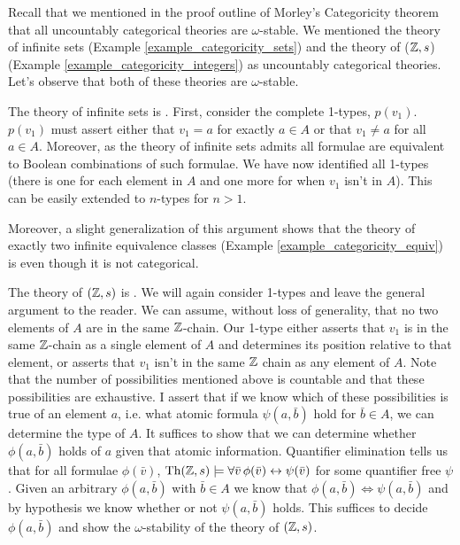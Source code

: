 Recall that we mentioned in the proof outline of Morley's Categoricity theorem that all uncountably categorical theories are \(\omega\)-stable. 
We mentioned the theory of infinite sets (Example \ref{example_categoricity_sets}) and the theory of (\(\mathbb{Z}, s\)) (Example \ref{example_categoricity_integers}) as uncountably categorical theories. 
Let's observe that both of these theories are \(\omega\)-stable. 

\begin{example}\label{example_omst_sets}
The theory of infinite sets is \omst. 
First, consider the complete 1-types, \(p(v_1)\). \(p(v_1)\) must assert either that \(v_1 = a\) for exactly \(a \in A\) or that \(v_1 \neq a\) for all \(a \in A\). 
Moreover, as the theory of infinite sets admits \qe \cite{mar} all formulae are equivalent to Boolean combinations of such formulae. %
We have now identified all 1-types (there is one for each element in \(A\) and one more for when \(v_1\) isn't in \(A\)). 
This can be easily extended to \(n\)-types for \(n > 1\).

Moreover, a slight generalization of this argument shows that the theory of exactly two infinite equivalence classes (Example \ref{example_categoricity_equiv}) is \omst even though it is not categorical. 
\end{example}

\begin{example}\label{example_omst_Z}
The theory of \((\mathbb{Z}, s)\) is \omst. 
We will again consider 1-types and leave the general argument to the reader. 
We can assume, without loss of generality, that no two elements of \(A\) are in the same \(\mathbb{Z}\)-chain. 
Our 1-type either asserts that \(v_1\) is in the same \(\mathbb{Z}\)-chain as a single element of \(A\) and determines its position relative to that element, or asserts that \(v_1\) isn't in the same \(\mathbb{Z}\) chain as any element of \(A\). 
Note that the number of possibilities mentioned above is countable and that these possibilities are exhaustive.
I assert that if we know which of these possibilities is true of an element \(a\), i.e. what atomic formula \(\psi(a, \bar{b})\) hold for \(\bar{b} \in A\), we can determine the type of \(A\). 
It suffices to show that we can determine whether \(\phi(a, \bar{b})\) holds of \(a\) given that atomic information.  
Quantifier elimination tells us that for all formulae \(\phi(\bar{v})\), \(\text{Th}(\mathbb{Z}, s) \models \forall \bar{v} \, \phi(\bar{v}) \leftrightarrow \psi(\bar{v})\) for some quantifier free \(\psi\).
Given an arbitrary \(\phi(a, \bar{b})\) with \(\bar{b} \in A\) we know that \(\phi(a, \bar{b}) \iff  \psi(a, \bar{b})\) and by hypothesis we know whether or not \(\psi(a, \bar{b})\) holds. 
This suffices to decide \(\phi(a, \bar{b})\) and show the \(\omega\)-stability of the theory of \((\mathbb{Z}, s)\).
\end{example}


